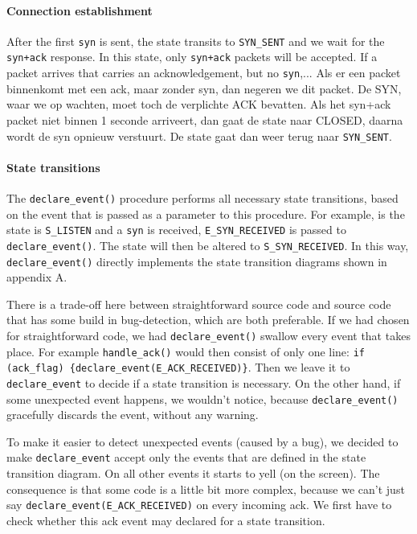 \documentclass[11pt]{article}
\begin{document}
\paragraph{Connection establishment}
    After the first \lstinline|syn| is sent, the state transits to \lstinline|SYN_SENT| 
    and we wait for the \lstinline|syn+ack| response. In this state, only 
    \lstinline|syn+ack| packets will be accepted. If a packet arrives that carries an
    acknowledgement, but no \lstinline|syn|,...
    Als er een packet binnenkomt met een ack, maar zonder syn, dan
    negeren we dit packet. De SYN, waar we  op wachten, moet toch de
    verplichte ACK bevatten. Als het syn+ack packet niet binnen 1 seconde
    arriveert, dan gaat de state naar CLOSED, daarna wordt de syn opnieuw
    verstuurt. De state gaat dan weer terug naar \lstinline|SYN_SENT|.
    
\paragraph{State transitions}
    The \lstinline|declare_event()| procedure performs all necessary state 
    transitions, based on the event that is passed as a parameter to this 
    procedure. For example, 
    is the state is \lstinline|S_LISTEN| and a \lstinline|syn| is received, 
    \lstinline|E_SYN_RECEIVED| is passed to \lstinline|declare_event()|. The state will 
    then be altered to \lstinline|S_SYN_RECEIVED|. In this way, \lstinline|declare_event()| directly implements the state 
    transition diagrams shown in appendix A.
    
    There is a trade-off here between straightforward source code and source 
    code that has some build in bug-detection, which are both preferable. If we 
    had chosen for straightforward code, we had \lstinline|declare_event()| swallow
    every event that takes place. For example \lstinline|handle_ack()| would then 
    consist of only one line: 
    \lstinline|if (ack_flag) {declare_event(E_ACK_RECEIVED)}|. Then we leave it to 
    \lstinline|declare_event| to decide if a state transition is necessary.
    On the other hand, if
    some unexpected event happens, we wouldn't notice, because 
    \lstinline|declare_event()| gracefully discards the event, without any warning.
    
    To make it easier to detect unexpected events (caused by a bug), we decided 
    to make \lstinline|declare_event| accept only the events that are defined in the
    state transition diagram. On all other events it starts to yell (on the 
    screen). The consequence is that some code is a little bit more complex, 
    because we can't just say \lstinline|declare_event(E_ACK_RECEIVED)|
    on every incoming ack. We first have to check whether this ack event may 
    declared for a state transition.
    
\end{document}
